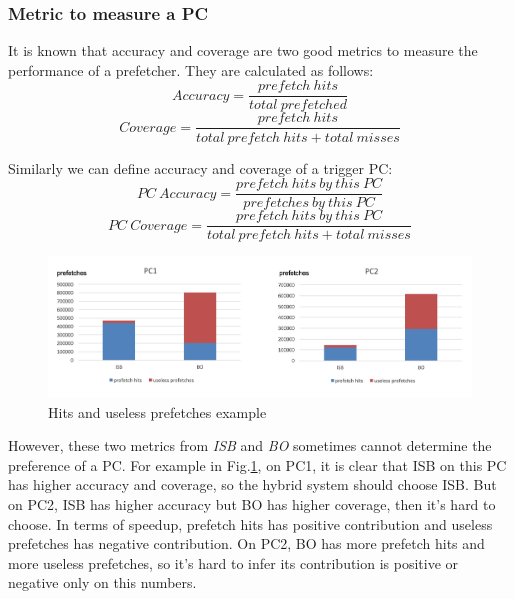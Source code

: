   \subsubsection{Metric to measure a PC}
  \label{sec:metricPC}

  It is known that accuracy and coverage are two good metrics \cite{yalepaper} to measure the performance of a prefetcher. They are calculated as follows:
  \begin{equation}
  Accuracy = \frac{prefetch\ hits}{total\  prefetched}
  \end{equation}
  \begin{equation}
  Coverage = \frac{prefetch\ hits}{total\ prefetch\ hits + total\ misses}
  \end{equation}

  Similarly we can define accuracy and coverage of a trigger PC:
  \begin{equation}
  PC\ Accuracy = \frac{prefetch\ hits\ by\ this\ PC}{prefetches\ by\ this\ PC}
  \end{equation}
  \begin{equation}
  PC\ Coverage = \frac{prefetch\ hits\ by\ this\ PC}{total\ prefetch\ hits + total\ misses}
 \end{equation}

 \begin{figure}[ht!]
	\centering
	\includegraphics[width=1.0\textwidth]{images/metric.png}
	\caption{Hits and useless prefetches example}
	\label{fig:pcmetric}
\end{figure}

However, these two metrics from \emph{ISB} and \emph{BO} sometimes cannot determine the preference of a PC.
For example in Fig.\ref{fig:pcmetric}, on PC1, it is clear that ISB on this PC has higher accuracy and coverage, so the hybrid system should choose ISB. But on PC2, ISB has higher accuracy but BO has higher coverage, then it's hard to choose.
In terms of speedup, prefetch hits has positive contribution and useless prefetches has negative contribution.
On PC2, BO has more prefetch hits and more useless prefetches, so it's hard to infer its contribution is positive or negative only on this numbers.

